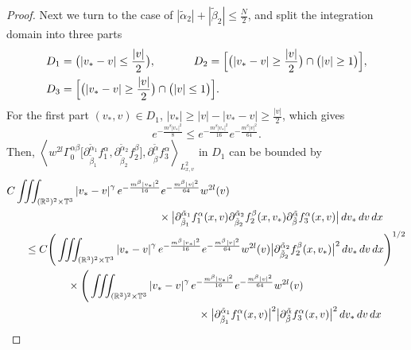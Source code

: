 \documentclass[reqno]{amsart}
\numberwithin{equation}{section}
\numberwithin{equation}{section}
\begin{document}
\begin{proof}
		Next we turn to the case of $|\tilde{\alpha}_2|+|\tilde{\beta}_2|\leq \frac{N}{2}$, and split the integration domain into three parts 
		\begin{align*}
			&D_1=\big(|v_*-v|\leq \frac{|v|}{2}\big),\hspace{1.2cm} D_2=\Big[\big(|v_*-v|\geq \frac{|v|}{2}\big)\cap \big(|v|\geq 1\big)\Big],\\
			& D_3=\Big[\big(|v_*-v|\geq \frac{|v|}{2}\big)\cap \big(|v|\leq 1\big)\Big].
		\end{align*}
		For the first part $(v_*,v)\in D_1$, $|v_*|\geq |v|-|v_*-v|\geq \frac{|v|}{2}$, which gives 
		\begin{equation*}
			e^{-\frac{m^{\beta}|v_*|^2}{8}} \leq e^{-\frac{m^{\beta}|v_*|^2}{16}}e^{-\frac{m^{\beta}|v|^2}{64}}.
		\end{equation*}
		Then, $\left\langle w^{2l}\Gamma^{\alpha \beta}_0 \big[\partial_{\tilde{\beta}_1}^{\tilde{\alpha}_1}f^{\alpha}_1, \partial_{\tilde{\beta}_2}^{\tilde{\alpha}_2}f^{\beta}_2\big],  \partial_{\tilde{\beta}}^{\tilde{\alpha}}f^{\alpha}_3 \right\rangle_{L_{x,v}^2}$ in $D_1$ can be bounded by
		\begin{align*}
			&C \iiint_{(\mathbb{R}^3)^2\times\mathbb{T}^3} \left| v_* - v \right|^\gamma e^{-\frac{m^{\beta}|v_*|^2}{16}}e^{-\frac{m^{\beta}|v|^2}{64}} w^{2l}(v)\\ 
			& \hspace{5cm}\times\big|\partial_{\tilde{\beta}_1}^{\tilde{\alpha}_1}f^{\alpha}_1 (x,v) \partial_{\tilde{\beta}_2}^{\tilde{\alpha}_2}f^{\beta}_2(x,v_*) \partial_{\tilde{\beta}}^{\tilde{\alpha}}f^{\alpha}_3 (x,v)\big| \,dv_*\,dv\,dx \\
			&\hspace{0.6cm}\leq C \Bigg( 
			\iiint_{(\mathbb{R}^3)^2\times\mathbb{T}^3} \left| v_* - v \right|^\gamma e^{-\frac{m^{\beta}|v_*|^2}{16}}e^{-\frac{m^{\beta}|v|^2}{64}} w^{2l}(v) 
			\big| \partial_{\tilde{\beta}_2}^{\tilde{\alpha}_2}f^{\beta}_2(x,v_*) \big|^2 \,dv_*\,dv\,dx 
			\Bigg)^{1/2} \\
			&\hspace{2cm} \times \Bigg( 
			\iiint_{(\mathbb{R}^3)^2\times\mathbb{T}^3} \left| v_* - v \right|^\gamma e^{-\frac{m^{\beta}|v_*|^2}{16}}e^{-\frac{m^{\beta}|v|^2}{64}} w^{2l}(v) \\
			&\hspace{6.3cm}\times\big| \partial_{\tilde{\beta}_1}^{\tilde{\alpha}_1}f^{\alpha}_1 (x,v) \big|^2 
			\big| \partial_{\tilde{\beta}}^{\tilde{\alpha}}f^{\alpha}_3 (x,v) \big|^2 \,dv_*\,dv\,dx 

\end{align*}
\end{proof}
\end{document}
